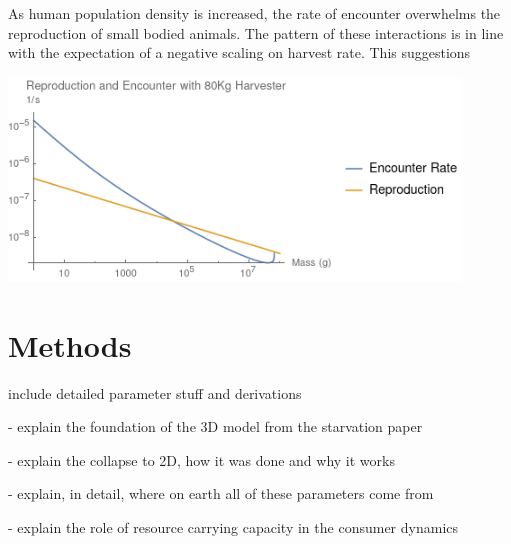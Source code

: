 \documentclass[]{rsos}%
\begin{document}
\vspace{0.5cm}

As human population density is increased, the rate of encounter overwhelms the reproduction of small bodied animals. The pattern of these interactions is in line with the expectation of a negative scaling on harvest rate. This suggestions \\

\vspace{0.5cm}

\includegraphics[width=0.9\textwidth]{encounter_plot.png}\\

\vspace{0.5cm}




















\section{Methods}

 include detailed parameter stuff and derivations

- explain the foundation of the 3D model from the starvation paper

- explain the collapse to 2D, how it was done and why it works

- explain, in detail, where on earth all of these parameters come from

- explain the role of resource carrying capacity in the consumer dynamics
\end{document}

